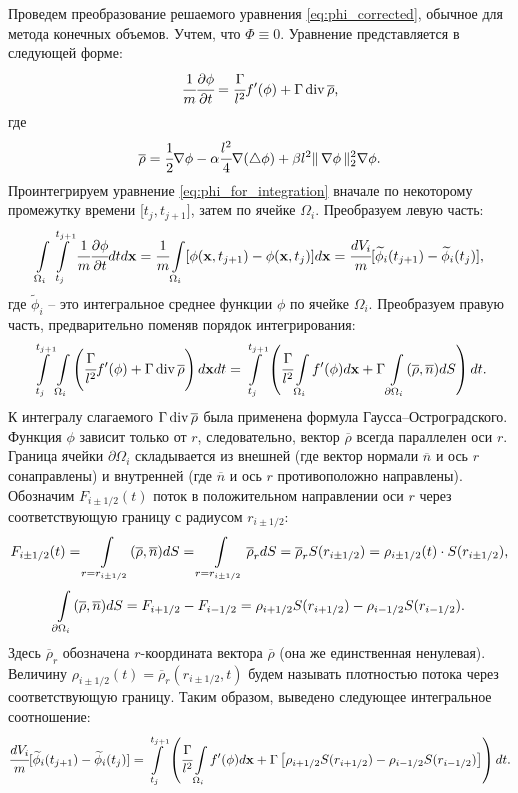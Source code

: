 Проведем преобразование решаемого уравнения \eqref{eq:phi_corrected}, обычное для метода конечных объемов. Учтем, что $\Phi \equiv 0$. Уравнение представляется в следующей форме:
\begin{equation}
    \cfrac{1}{m} \cfrac{\partial \phi}{\partial t} = \cfrac{\Gamma}{l^2} f'(\phi) + \Gamma \operatorname{{div}} \overline{\rho} {\text{,}}
    \label{eq:phi_for_integration}
\end{equation}
где
$$\overline{\rho} = \cfrac{1}{2} \nabla \phi - \alpha \cfrac{l^2}{4} \nabla (\triangle \phi) + \beta l^2 \| \, \nabla \phi \, \|_2^2 \nabla \phi {\text{.}}$$
Проинтегрируем уравнение \eqref{eq:phi_for_integration} вначале по некоторому промежутку времени [$t_j, t_{j + 1}]$, затем по ячейке $\Omega_i$. Преобразуем левую часть:
$$\int\limits_{\Omega_i} \int\limits_{t_j}^{t_{j + 1}} \cfrac{1}{m} \cfrac{\partial \phi}{\partial t} dt d \mathbf{x} = \cfrac{1}{m} \int\limits_{\Omega_i} [\phi(\mathbf{x}, t_{j + 1}) - \phi(\mathbf{x}, t_j)] d \mathbf{x} = \cfrac{dV_i}{m} [\widetilde{\phi}_i(t_{j + 1}) - \widetilde{\phi}_i(t_j)] {\text{,}}$$
где $\widetilde{\phi}_i$ -- это интегральное среднее функции $\phi$ по ячейке $\Omega_i$. Преобразуем правую часть, предварительно поменяв порядок интегрирования:
$$\int\limits_{t_j}^{t_{j + 1}} \int\limits_{\Omega_i} \left( \cfrac{\Gamma}{l^2} f'(\phi) + \Gamma \operatorname{{div}} \overline{\rho} \right) d \mathbf{x} dt = \int\limits_{t_j}^{t_{j + 1}} \left( \cfrac{\Gamma}{l^2} \int\limits_{\Omega_i} f'(\phi) d \mathbf{x} + \Gamma \int\limits_{\partial \Omega_i} (\overline{\rho}, \overline{n}) dS \right) dt {\text{.}}$$
К интегралу слагаемого $\Gamma \operatorname{{div}} \overline{\rho}$ была применена формула Гаусса--Остроградского. Функция $\phi$ зависит только от $r$, следовательно, вектор $\overline{\rho}$ всегда параллелен оси $r$. Граница ячейки $\partial \Omega_i$ складывается из внешней (где вектор нормали $\overline{n}$ и ось $r$ сонаправлены) и внутренней (где $\overline{n}$ и ось $r$ противоположно направлены). Обозначим $F_{i \pm 1/2}(t)$ поток в положительном направлении оси $r$ через соответствующую границу с радиусом $r_{i \pm 1/2}$:
$$F_{i \pm 1/2}(t) = \int\limits_{r = r_{i \pm 1/2}} (\overline{\rho}, \overline{n}) dS = \int\limits_{r = r_{i \pm 1/2}} \overline{\rho}_r dS = \overline{\rho}_r S(r_{i \pm 1/2}) = \rho_{i \pm 1/2}(t) \cdot S(r_{i \pm 1/2}) {\text{,}}$$
$$\int\limits_{\partial \Omega_i} (\overline{\rho}, \overline{n}) dS = F_{i + 1/2} - F_{i - 1/2} = \rho_{i + 1/2} S(r_{i + 1/2}) - \rho_{i - 1/2} S(r_{i - 1/2}) {\text{.}}$$
Здесь $\overline{\rho}_r$ обозначена $r$-координата вектора $\overline{\rho}$ (она же единственная ненулевая). Величину $\rho_{i \pm 1/2}(t) = \overline{\rho}_r(r_{i \pm 1/2}, t)$ будем называть плотностью потока через соответствующую границу. Таким образом, выведено следующее интегральное соотношение:
\begin{equation}
    \cfrac{dV_i}{m} [\widetilde{\phi}_i(t_{j + 1}) - \widetilde{\phi}_i(t_j)] = \int\limits_{t_j}^{t_{j + 1}} \left( \cfrac{\Gamma}{l^2} \int\limits_{\Omega_i} f'(\phi) d \mathbf{x} + \Gamma \left[ \rho_{i + 1/2} S(r_{i + 1/2}) - \rho_{i - 1/2} S(r_{i - 1/2}) \right] \right) dt {\text{.}}
    \label{eq:finite_volume_integral}
\end{equation}

